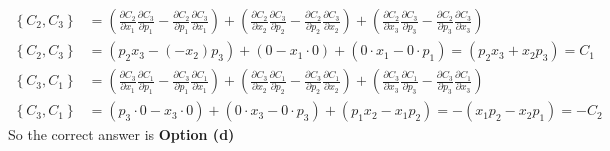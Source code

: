 \begin{enumerate}
\begin{answer}
$$\begin{aligned}
	\left\{C_{2}, C_{3}\right\}&=\left(\frac{\partial C_{2}}{\partial x_{1}} \frac{\partial C_{3}}{\partial p_{1}}-\frac{\partial C_{2}}{\partial p_{1}} \frac{\partial C_{3}}{\partial x_{1}}\right)+\left(\frac{\partial C_{2}}{\partial x_{2}} \frac{\partial C_{3}}{\partial p_{2}}-\frac{\partial C_{2}}{\partial p_{2}} \frac{\partial C_{3}}{\partial x_{2}}\right)+\left(\frac{\partial C_{2}}{\partial x_{3}} \frac{\partial C_{3}}{\partial p_{3}}-\frac{\partial C_{2}}{\partial p_{3}} \frac{\partial C_{3}}{\partial x_{3}}\right) \\
	\left\{C_{2}, C_{3}\right\}&=\left(p_{2} x_{3}-\left(-x_{2}\right) p_{3}\right)+\left(0-x_{1} \cdot 0\right)+\left(0 \cdot x_{1}-0 \cdot p_{1}\right)=\left(p_{2} x_{3}+x_{2} p_{3}\right)=C_{1}\\
	\left\{C_{3}, C_{1}\right\}&=\left(\frac{\partial C_{3}}{\partial x_{1}} \frac{\partial C_{1}}{\partial p_{1}}-\frac{\partial C_{3}}{\partial p_{1}} \frac{\partial C_{1}}{\partial x_{1}}\right)+\left(\frac{\partial C_{3}}{\partial x_{2}} \frac{\partial C_{1}}{\partial p_{2}}-\frac{\partial C_{3}}{\partial p_{2}} \frac{\partial C_{1}}{\partial x_{2}}\right)+\left(\frac{\partial C_{3}}{\partial x_{3}} \frac{\partial C_{1}}{\partial p_{3}}-\frac{\partial C_{3}}{\partial p_{3}} \frac{\partial C_{1}}{\partial x_{3}}\right) \\
	\left\{C_{3}, C_{1}\right\}&=\left(p_{3} \cdot 0-x_{3} \cdot 0\right)+\left(0 \cdot x_{3}-0 \cdot p_{3}\right)+\left(p_{1} x_{2}-x_{1} p_{2}\right)=-\left(x_{1} p_{2}-x_{2} p_{1}\right)=-C_{2}
\end{aligned}
$$
So the correct answer is \textbf{Option (d)}
\end{answer}
\end{enumerate}